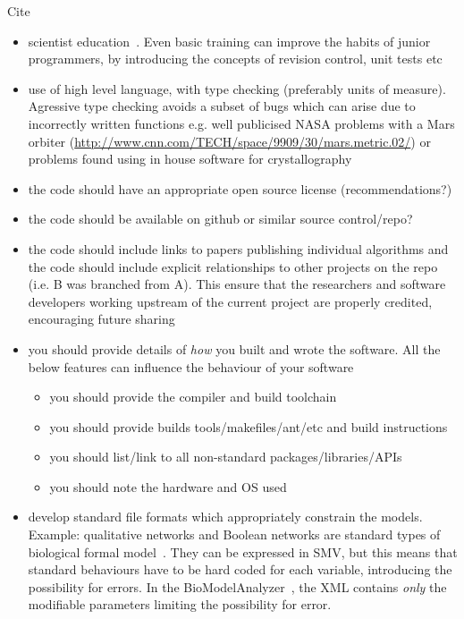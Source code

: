 \documentclass[conference]{IEEEtran}
\begin{document}
Cite~\cite{collberg-et-al:2014}

\begin{itemize}
\item scientist education~\cite{Wilson2014}. Even basic training can improve the habits of junior programmers, by introducing the concepts of revision control, unit tests etc
\item use of high level language, with type checking (preferably units of measure). Agressive type checking avoids a subset of bugs which can arise due to incorrectly written functions e.g. well publicised NASA problems with a Mars orbiter (\url{http://www.cnn.com/TECH/space/9909/30/mars.metric.02/}) or problems found using in house software for crystallography \cite{Miller2006}
\item the code should have an appropriate open source license (recommendations?)
\item the code should be available on github or similar source control/repo?
\item the code should include links to papers publishing individual algorithms and the code should include explicit relationships to other projects on the repo (i.e. B was branched from A). This ensure that the researchers and software developers working upstream of the current project are properly credited, encouraging future sharing
\item you should provide details of \emph{how} you built and wrote the software. All the below features can influence the behaviour of your software
\begin{itemize}
\item you should provide the compiler and build toolchain
\item you should provide builds tools/makefiles/ant/etc and build instructions
\item you should list/link to all non-standard packages/libraries/APIs
\item you should note the hardware and OS used
\end{itemize}
\item develop standard file formats which appropriately constrain the models. Example: qualitative networks and Boolean networks are standard types of biological formal model~\cite{Kauffman1969,Schaub2007}. They can be expressed in SMV, but this means that standard behaviours have to be hard coded for each variable, introducing the possibility for errors. In the BioModelAnalyzer~\cite{Benque2012}, the XML contains \emph{only} the modifiable parameters limiting the possibility for error.

\end{itemize}
\end{document}
